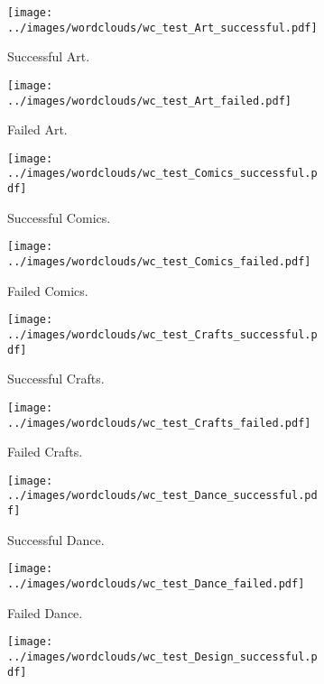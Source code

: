\documentclass{article}
\begin{document}
\begin{figure}
  \begin{subfigure}[a]{0.2\linewidth}
    \centering\texttt{[image: ../images/wordclouds/wc\_test\_Art\_successful.pdf]}
    \caption{Successful Art.}
    \label{fig:Art_s_test}
  \end{subfigure}
  \begin{subfigure}[a']{0.2\linewidth}
    \centering\texttt{[image: ../images/wordclouds/wc\_test\_Art\_failed.pdf]}
    \caption{Failed Art.}
    \label{fig:Art_f_test}
  \end{subfigure}
  \begin{subfigure}[b]{0.2\linewidth}
    \centering\texttt{[image: ../images/wordclouds/wc\_test\_Comics\_successful.pdf]}
    \caption{Successful Comics.}
    \label{fig:Comic_s_test}
  \end{subfigure} 
  \begin{subfigure}[b']{0.2\linewidth}
    \centering\texttt{[image: ../images/wordclouds/wc\_test\_Comics\_failed.pdf]}
    \caption{Failed Comics.}
    \label{fig:Comic_f_test}
  \end{subfigure}
  \begin{subfigure}[c]{0.2\linewidth}
    \centering\texttt{[image: ../images/wordclouds/wc\_test\_Crafts\_successful.pdf]}
    \caption{Successful Crafts.}
    \label{fig:Crafts_s_test}
  \end{subfigure}
    \begin{subfigure}[c']{0.2\linewidth}
    \centering\texttt{[image: ../images/wordclouds/wc\_test\_Crafts\_failed.pdf]}
    \caption{Failed Crafts.}
    \label{fig:Crafts_f_test}
  \end{subfigure}
    \begin{subfigure}[d]{0.2\linewidth}
    \centering\texttt{[image: ../images/wordclouds/wc\_test\_Dance\_successful.pdf]}
    \caption{Successful Dance.}
    \label{fig:Dance_s_test}
  \end{subfigure}
    \begin{subfigure}[d']{0.2\linewidth}
    \centering\texttt{[image: ../images/wordclouds/wc\_test\_Dance\_failed.pdf]}
    \caption{Failed Dance.}
    \label{fig:Dance_f_test}
   \end{subfigure}
    \begin{subfigure}[e]{0.2\linewidth}
    \centering\texttt{[image: ../images/wordclouds/wc\_test\_Design\_successful.pdf]}

\end{subfigure}
\end{figure}
\end{document}
